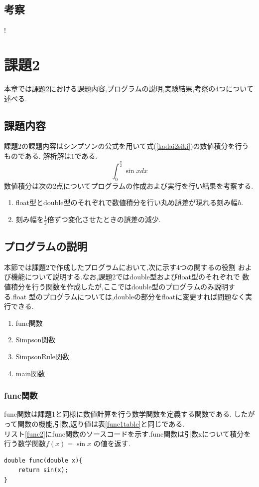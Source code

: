 \documentclass[dvipdfmx]{jarticle}
\begin{document}
    \subsection{考察}
    !
    \section{課題2}
    本章では課題2における課題内容,プログラムの説明,実験結果,考察の4つについて述べる.
    \subsection{課題内容}
    課題2の課題内容はシンプソンの公式を用いて式(\ref{kadai2siki})の数値積分を行うものである.
    解析解は$1$である.
    \begin{equation}
      \int_0^\frac{\pi}{2} \sin x dx
          \label{kadai2siki}
        \end{equation}
    数値積分は次の2点についてプログラムの作成および実行を行い結果を考察する.
    \begin{enumerate}
      \item float型とdouble型のそれぞれで数値積分を行い丸め誤差が現れる刻み幅$h$.
      \item 刻み幅を$\frac{1}{2}$倍ずつ変化させたときの誤差の減少.
      \end{enumerate}

    \subsection{プログラムの説明}
    本節では課題2で作成したプログラムにおいて,次に示す4つの関するの役割
    および機能について説明する.なお,課題2ではdouble型およびfloat型のそれぞれで
    数値積分を行う関数を作成したが,ここではdouble型のプログラムのみ説明する.float
    型のプログラムについては,doubleの部分をfloatに変更すれば問題なく実行できる.
    \begin{enumerate}
      \item func関数
      \item Simpson関数
      \item SimpsonRule関数
      \item main関数
      \end{enumerate}
    
    \subsubsection{func関数}
    func関数は課題1と同様に数値計算を行う数学関数を定義する関数である.
    したがって関数の機能,引数,返り値は表\ref{func1table}と同じである.\\
      リスト\ref{func2}にfunc関数のソースコードを示す.func関数は引数xについて積分を行う数学関数$f(x)=\sin x$
      の値を返す.
      \begin{lstlisting}[basicstyle=\ttfamily\footnotesize, frame=single,label=func2,caption=func関数]
double func(double x){
    return sin(x);
} 
            \end{lstlisting}
\end{document}
